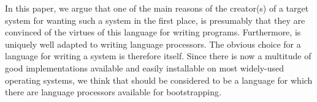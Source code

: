 In this paper, we argue that one of the main reasons of the creator(s)
of a target \commonlisp{} system for wanting such a system in the
first place, is presumably that they are convinced of the virtues of
this language for writing programs.  Furthermore, \commonlisp{} is
uniquely well adapted to writing language processors.  The obvious
choice for a language for writing a \commonlisp{} system is therefore
\commonlisp{} itself.  Since there is now a multitude of good
\commonlisp{} implementations available and easily installable on most
widely-used operating systems, we think that \commonlisp{} should be
considered to be a language for which there are language processors
available for bootstrapping.
